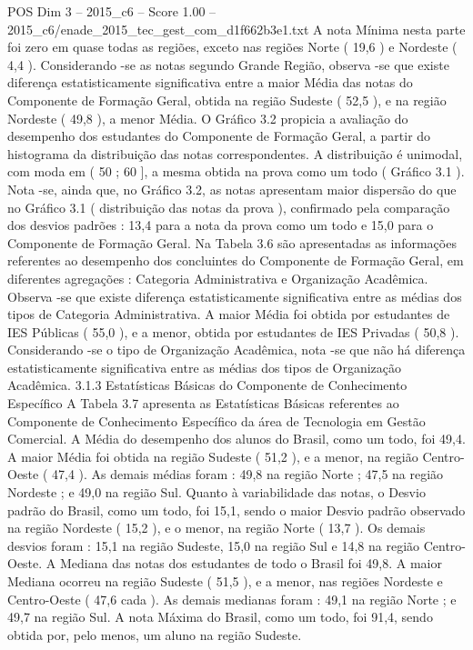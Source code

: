\begin{textsample}{POS Dim 3 – 2015\_c6 – Score 1.00 – 2015\_c6/enade\_2015\_tec\_gest\_com\_d1f662b3e1.txt}
A nota Mínima nesta parte foi zero em quase todas as regiões, exceto nas regiões Norte ( 19,6 ) e Nordeste ( 4,4 ).
Considerando -se as notas segundo Grande Região, observa -se que existe diferença estatisticamente significativa entre a maior Média das notas do Componente de Formação Geral, obtida na região Sudeste ( 52,5 ), e na região Nordeste ( 49,8 ), a menor Média.
O Gráfico 3.2 propicia a avaliação do desempenho dos estudantes do Componente de Formação Geral, a partir do histograma da distribuição das notas correspondentes.
A distribuição é unimodal, com moda em ( 50 ; 60 ], a mesma obtida na prova como um todo ( Gráfico 3.1 ).
Nota -se, ainda que, no Gráfico 3.2, as notas apresentam maior dispersão do que no Gráfico 3.1 ( distribuição das notas da prova ), confirmado pela comparação dos desvios padrões : 13,4 para a nota da prova como um todo e 15,0 para o Componente de Formação Geral.
Na Tabela 3.6 são apresentadas as informações referentes ao desempenho dos concluintes do Componente de Formação Geral, em diferentes agregações : Categoria Administrativa e Organização Acadêmica.
Observa -se que existe diferença estatisticamente significativa entre as médias dos tipos de Categoria Administrativa.
A maior Média foi obtida por estudantes de IES Públicas ( 55,0 ), e a menor, obtida por estudantes de IES Privadas ( 50,8 ).
Considerando -se o tipo de Organização Acadêmica, nota -se que não há diferença estatisticamente significativa entre as médias dos tipos de Organização Acadêmica. 3.1.3 Estatísticas Básicas do Componente de Conhecimento Específico A Tabela 3.7 apresenta as Estatísticas Básicas referentes ao Componente de Conhecimento Específico da área de Tecnologia em Gestão Comercial.
A Média do desempenho dos alunos do Brasil, como um todo, foi 49,4.
A maior Média foi obtida na região Sudeste ( 51,2 ), e a menor, na região Centro-Oeste ( 47,4 ).
As demais médias foram : 49,8 na região Norte ; 47,5 na região Nordeste ; e 49,0 na região Sul.
Quanto à variabilidade das notas, o Desvio padrão do Brasil, como um todo, foi 15,1, sendo o maior Desvio padrão observado na região Nordeste ( 15,2 ), e o menor, na região Norte ( 13,7 ).
Os demais desvios foram : 15,1 na região Sudeste, 15,0 na região Sul e 14,8 na região Centro-Oeste.
A Mediana das notas dos estudantes de todo o Brasil foi 49,8.
A maior Mediana ocorreu na região Sudeste ( 51,5 ), e a menor, nas regiões Nordeste e Centro-Oeste ( 47,6 cada ).
As demais medianas foram : 49,1 na região Norte ; e 49,7 na região Sul.
A nota Máxima do Brasil, como um todo, foi 91,4, sendo obtida por, pelo menos, um aluno na região Sudeste.

\end{textsample}

